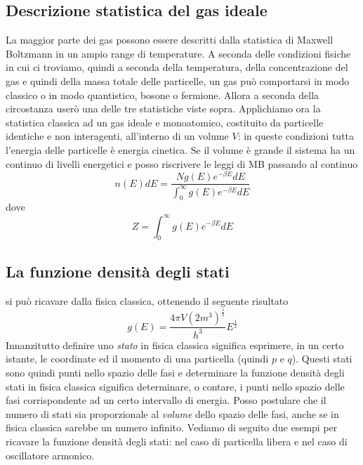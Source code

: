 \subsection{Descrizione statistica del gas ideale}
La maggior parte dei gas possono essere descritti dalla statistica di Maxwell Boltzmann in un ampio range di temperature.
A seconda delle condizioni fisiche in cui ci troviamo, quindi a seconda della temperatura, della concentrazione del gas e quindi della massa totale delle particelle, un gas può comportarsi in modo classico o in modo quantistico, bosone o fermione. 
Allora a seconda della circostanza userò una delle tre statistiche viste sopra.
Applichiamo ora la statistica classica ad un gas ideale e monoatomico, costituito da particelle identiche e non interagenti, all'interno di un volume $V$:
in queste condizioni tutta l'energia delle particelle è energia cinetica.
Se il volume è grande il sistema ha un continuo di livelli energetici e posso riscrivere le leggi di MB passando al continuo
\begin{equation}
n(E)dE = \frac{N g(E) e^{-\beta E} dE}{\int_0^\infty g(E) e^{-\beta E} dE }
\label{numero_particelle}
\end{equation}
dove
\begin{equation}
Z = \int_0^{\infty} g(E) e^{ -\beta E } dE
\end{equation}


\subsection{La funzione densità degli stati}
si può ricavare dalla fisica classica, ottenendo il seguente risultato
\begin{equation} 
g(E) = \frac{4 \pi V (2m^3)^{ \frac{1}{2} }}{h^3} E^{ \frac{1}{2} }
\label{dens_stati}
\end{equation}
Innanzitutto definire uno \textit{stato} in fisica classica significa esprimere, in un certo istante, le coordinate ed il momento di una particella (quindi $p$ e $q$). 
Questi stati sono quindi punti nello spazio delle fasi e determinare la funzione densità degli stati in fisica classica significa determinare, o contare, i punti nello spazio delle fasi corrispondente ad un certo intervallo di energia.
Posso postulare che il numero di stati sia proporzionale al \textit{volume} dello spazio delle fasi, anche se in fisica classica sarebbe un numero infinito.
Vediamo di seguito due esempi per ricavare la funzione densità degli stati: nel caso di particella libera e nel caso di oscillatore armonico.

